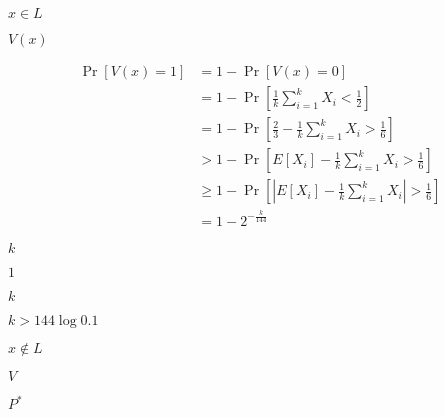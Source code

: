 \documentclass[10pt]{book}
\begin{document}
\begin{mdSnippets}
\begin{mdInlineSnippet}[7788b409a9b3225cf8aecc6149a2bd2e]
$x \in L$\end{mdInlineSnippet}%
\begin{mdInlineSnippet}[7da3f9417e349bc472da3b128413cd70]%
$V(x)$\end{mdInlineSnippet}%
\begin{mdDisplaySnippet}%
\[%
\begin{aligned}
\Pr[V(x) = 1] &= 1 - \Pr[V(x) = 0] \\
&= 1 - \Pr[\frac{1}{k} \sum_{i=1}^k X_i < \frac{1}{2}] \\
&= 1 - \Pr[\frac{2}{3} - \frac{1}{k} \sum_{i=1}^k X_i > \frac{1}{6}] \\
&> 1 - \Pr[E[X_i] - \frac{1}{k} \sum_{i=1}^k X_i > \frac{1}{6}] \\
&\geq 1 - \Pr[|E[X_i] - \frac{1}{k} \sum_{i=1}^k X_i| > \frac{1}{6}]  \\
&= 1 - 2^{-\frac{k}{144}}
\end{aligned}
\]%
\end{mdDisplaySnippet}%
\begin{mdInlineSnippet}[8ce4b16b22b58894aa86c421e8759df3]%
$k$\end{mdInlineSnippet}%
\begin{mdInlineSnippet}[c4ca4238a0b923820dcc509a6f75849b]%
$1$\end{mdInlineSnippet}%
\begin{mdInlineSnippet}[8ce4b16b22b58894aa86c421e8759df3]%
$k$\end{mdInlineSnippet}%
\begin{mdInlineSnippet}[1ab1edcce468871fa86b68a6a26ff7dc]%
$k > 144 \log 0.1$\end{mdInlineSnippet}%
\begin{mdInlineSnippet}[8e681b85e2ea0786a5bcdc939df91b34]%
$x \notin L$\end{mdInlineSnippet}%
\begin{mdInlineSnippet}[5206560a306a2e085a437fd258eb57ce]%
$V$\end{mdInlineSnippet}%
\begin{mdInlineSnippet}%
$P^*$\end{mdInlineSnippet}%
\begin{mdDisplaySnippet}[ae37f283c02c6da947d8b58945b522dd]%

\end{mdDisplaySnippet}
\end{mdSnippets}
\end{document}
